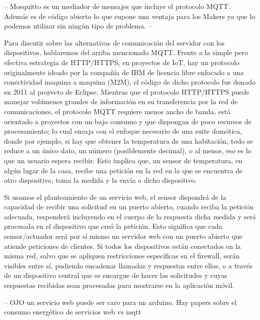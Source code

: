 \vspace{1cm}
--
Mosquitto es un mediador de mensajes que incluye el protocolo MQTT. Además es de código abierto lo que supone una ventaja para los Makers ya que lo podemos utilizar sin ningún tipo de problema.
--
\vspace{1cm}

Para discutir sobre las alternativas de comunicación del servidor con los dispositivos, hablaremos del arriba mencionado MQTT. Frente a la simple pero efectiva estrategia de HTTP/HTTPS, en proyectos de IoT, hay un protocolo originalmente ideado por la compañía de IBM de licencia libre enfocado a una conectividad maquina a maquina (M2M), el código de dicho protocolo fue donado en 2011 al proyecto de Eclipse. Mientras que el protocolo HTTP/HTTPS puede manejar volúmenes grandes de información en su transferencia por la red de comunicaciones, el protocolo MQTT requiere menos ancho de banda, está orientado a proyectos con un bajo consumo y que dispongan de poco recursos de procesamiento; lo cual encaja con el enfoque necesario de una suite domótica, donde por ejemplo, si hay que obtener la temperatura de una habitación, todo se reduce a un único dato, un número (posiblemente decimal), o al menos, eso es lo que un usuario espera recibir. Esto implica que, un sensor de temperatura, en algún lugar de la casa, recibe una petición en la red en la que se encuentra de otro dispositivo, toma la medida y la envía a dicho dispositivo.

\vspace{1cm}

Si usamos el planteamiento de un servicio web, el sensor dispondrá de la capacidad de recibir una solicitud en un puerto abierto, cuando reciba la petición adecuada, responderá incluyendo en el cuerpo de la respuesta dicha medida y será procesada en el dispositivo que creó la petición. Esto significa que cada sensor/actuador será por sí mismo un servidor web con un puerto abierto que atiende peticiones de clientes. Si todos los dispositivos están conectados en la misma red, salvo que se apliquen restricciones específicas en el firewall, serán visibles entre sí, pudiendo encadenar llamadas y respuestas entre ellos, o a través de un dispositivo central que se encargue de hacer las solicitudes y cuyas respuestas recibidas sean procesadas para mostrarse en la aplicación móvil.

 -- OJO
 un servicio web puede ser caro para un arduino. Hay papers sobre el consumo energético de servicios web vs mqtt

